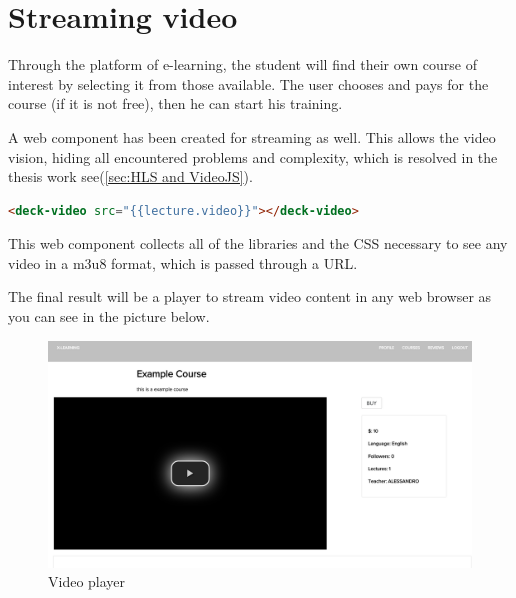 \section{Streaming video}
\label{sec:attend_the_course}

Through the platform of e-learning, the student will find their own course of interest by selecting it from those available.
The user chooses and pays for the course (if it is not free), then he can start his training.

A web component has been created for streaming as well. This allows the video vision, hiding all encountered problems and complexity, which is resolved in the thesis work see(\ref{sec:HLS and VideoJS}).

\begin{lstlisting}[language=html]
  <deck-video src="{{lecture.video}}"></deck-video>
\end{lstlisting}
This web component collects all of the libraries and the CSS necessary to see any video in a m3u8 format, which is passed through a URL.

The final result will be a player to stream video content in any web browser as you can see in the picture below.

\begin{figure}[htb]
 \centering
 \includegraphics[width=1.0\linewidth]{images/chapter6/deck_video.png}\hfill
 \caption[Video player]{Video player}
 \label{fig:fourV}
\end{figure}
